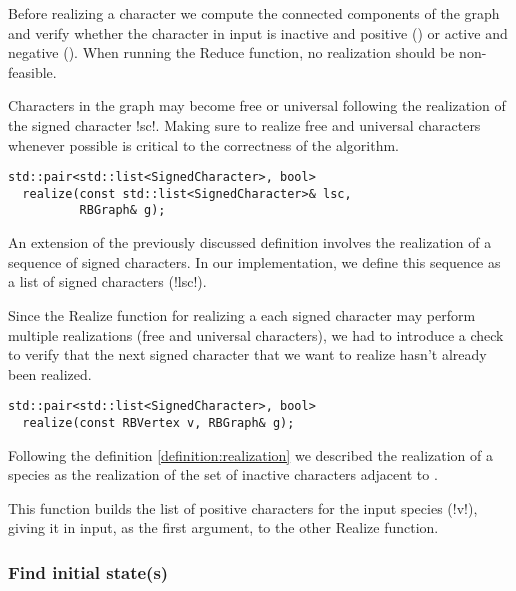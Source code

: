 Before realizing a character we compute the connected components of the graph and verify whether the character in input is inactive and positive (\character[][+]) or active and negative (\character[][-]).
When running the Reduce function, no realization should be non-feasible.

Characters in the graph may become free or universal following the realization of the signed character !sc!.
Making sure to realize free and universal characters whenever possible is critical to the correctness of the algorithm.

\text{} %

\begin{lstlisting}[moreemph={RBGraph, SignedCharacter},
                   moreemph={[2]realize}]
  std::pair<std::list<SignedCharacter>, bool>
  realize(const std::list<SignedCharacter>& lsc,
          RBGraph& g);
\end{lstlisting}

An extension of the previously discussed definition involves the realization of a sequence of signed characters.
In our implementation, we define this sequence as a list of signed characters \character[][\pm] (!lsc!).

Since the Realize function for realizing a each signed character may perform multiple realizations (free and universal characters), we had to introduce a check to verify that the next signed character that we want to realize hasn't already been realized.

\text{} %

\begin{lstlisting}[moreemph={RBGraph, SignedCharacter, RBVertex},
                   moreemph={[2]realize}]
  std::pair<std::list<SignedCharacter>, bool>
  realize(const RBVertex v, RBGraph& g);
\end{lstlisting}

Following the definition \ref{definition:realization} we described the realization of a species \species[i] as the realization of the set of inactive characters adjacent to \species[i].

This function builds the list of positive characters \character[j][+] for the input species \species[i] (!v!), giving it in input, as the first argument, to the other Realize function.

\subsubsection{Find initial state(s)}\label{section:initial-state}

